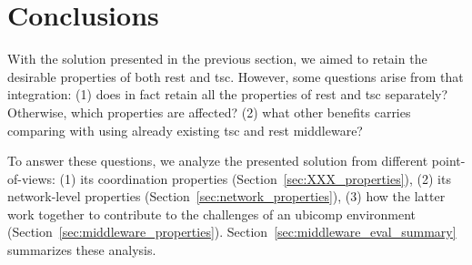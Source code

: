 \section{Conclusions} %

With the solution presented in the previous section, we aimed to retain the desirable properties of both \ac{rest} and \ac{tsc}.
However, some questions arise from that integration:
(1) does in fact retain all the properties of \ac{rest} and \ac{tsc} separately? Otherwise, which properties are affected?
(2) what other benefits carries comparing with using already existing \ac{tsc} and \ac{rest} middleware?



To answer these questions, we analyze the presented solution from different point-of-views:
(1) its coordination properties (Section~\ref{sec:XXX_properties}),
(2) its network-level properties (Section~\ref{sec:network_properties}),
(3) how the latter work together to contribute to the challenges of an \ac{ubicomp} environment (Section~\ref{sec:middleware_properties}).
Section~\ref{sec:middleware_eval_summary} summarizes these analysis. %


